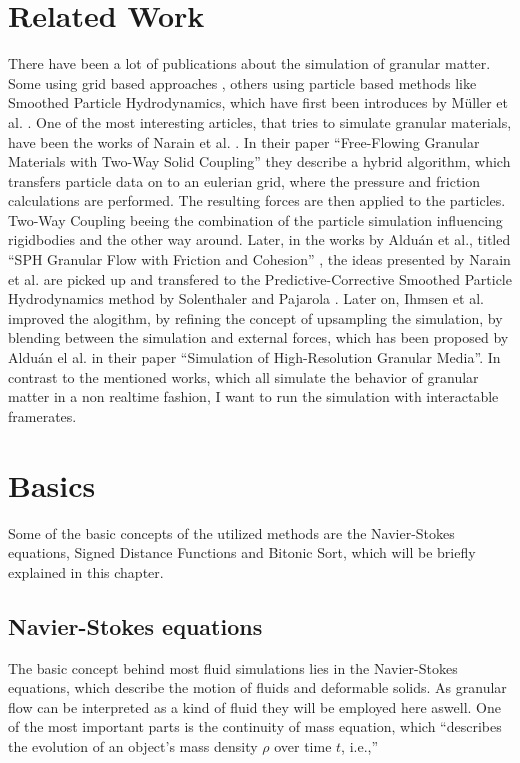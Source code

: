 \documentclass[intern]{cgMA}
\begin{document}
    \section{Related Work}\label{sec:related}
    There have been a lot of publications about the simulation of granular matter. Some using grid based approaches \cite{10.1145/1866158.1866195}, others using particle based methods like Smoothed Particle Hydrodynamics, which have first been introduces by Müller et al. \cite{10.5555/846276.846298}. 
    One of the most interesting articles, that tries to simulate granular materials, have been the works of Narain et al. \cite{10.1145/1866158.1866195}. In their paper \enquote{Free-Flowing Granular Materials with Two-Way Solid Coupling} they describe a hybrid algorithm, which transfers particle data on to an eulerian grid, where the pressure and friction calculations are performed. The resulting forces are then applied to the particles. Two-Way Coupling beeing the combination of the particle simulation influencing rigidbodies and the other way around. 
    Later, in the works by Alduán et al., titled \enquote{SPH Granular Flow with Friction and Cohesion} \cite{10.1145/2019406.2019410}, the ideas presented by Narain et al. \cite{10.1145/1866158.1866195} are picked up and transfered to the Predictive-Corrective Smoothed Particle Hydrodynamics method by Solenthaler and Pajarola \cite{10.1145/1576246.1531346}. Later on, Ihmsen et al. \cite{10.2312:PE:vriphys:vriphys12:053-060} improved the alogithm, by refining the concept of upsampling the simulation, by blending between the simulation and external forces, which has been proposed by Alduán el al. \cite{10.2312:LocalChapterEvents:CEIG:CEIG09:011-018} in their paper \enquote{Simulation of High-Resolution Granular Media}. 
    In contrast to the mentioned works, which all simulate the behavior of granular matter in a non realtime fashion, I want to run the simulation with interactable framerates.
    \pagebreak
    
    \section{Basics}\label{sec:basics}
    Some of the basic concepts of the utilized methods are the Navier-Stokes equations, Signed Distance Functions and Bitonic Sort, which will be briefly explained in this chapter.

    \subsection{Navier-Stokes equations}
    The basic concept behind most fluid simulations lies in the Navier-Stokes equations, which describe the motion of fluids and deformable solids. As granular flow can be interpreted as a kind of fluid they will be employed here aswell. One of the most important parts is the continuity of mass equation, which \enquote{describes the evolution of an object's mass density $\rho$ over time $t$, i.e.,} \cite{survey_on_sph}
    
\end{document}
